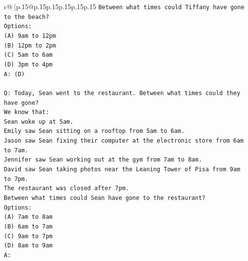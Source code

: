 \documentclass{article}
\begin{document}
{\begin{supertabular}{c@{$\;$}|p{.15\linewidth}@{}p{.15\linewidth}p{.15\linewidth}p{.15\linewidth}p{.15\linewidth}p{.15\linewidth}}
{{{\texttt{Between what times could Tiffany have gone to the beach?} \\
\texttt{Options:} \\
\texttt{(A) 9am to 12pm} \\
\texttt{(B) 12pm to 2pm} \\
\texttt{(C) 5am to 6am} \\
\texttt{(D) 3pm to 4pm} \\
\texttt{A: (D)} \\
\\ 
\texttt{Q: Today, Sean went to the restaurant. Between what times could they have gone?} \\
\texttt{We know that:} \\
\texttt{Sean woke up at 5am.} \\
\texttt{Emily saw Sean sitting on a rooftop from 5am to 6am.} \\
\texttt{Jason saw Sean fixing their computer at the electronic store from 6am to 7am.} \\
\texttt{Jennifer saw Sean working out at the gym from 7am to 8am.} \\
\texttt{David saw Sean taking photos near the Leaning Tower of Pisa from 9am to 7pm.} \\
\texttt{The restaurant was closed after 7pm.} \\
\texttt{Between what times could Sean have gone to the restaurant?} \\
\texttt{Options:} \\
\texttt{(A) 7am to 8am} \\
\texttt{(B) 6am to 7am} \\
\texttt{(C) 9am to 7pm} \\
\texttt{(D) 8am to 9am} \\
\texttt{A:} \\
            }
        }
    }
     \\ \\


\end{supertabular}}
\end{document}
